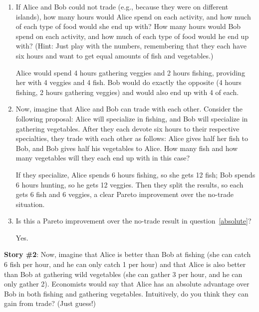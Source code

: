 \documentclass{article}
\newcommand{\myskip}{\vspace{.1in}}
\begin{document}
    \begin{enumerate}
    \item \label{absolute} If Alice and Bob could not trade (e.g., because they were on different islands), how many hours would Alice spend on each activity, and how much of each type of food would she end up with? How many hours would Bob spend on each activity, and how much of each type of food would he end up with? (Hint: Just play with the numbers, remembering that they each have six hours and want to get equal amounts of fish and vegetables.)
\myskip

\begin{KEY}
Alice would spend 4 hours gathering veggies and 2 hours fishing, providing her with 4 veggies and 4 fish. Bob would do exactly the opposite (4 hours fishing, 2 hours gathering veggies) and would also end up with 4 of each.
\end{KEY}

    \item Now, imagine that Alice and Bob can trade with each other. Consider the following proposal: Alice will specialize in fishing, and Bob will specialize in gathering vegetables. After they each devote six hours to their respective specialties, they trade with each other as follows: Alice gives half her fish to Bob, and Bob gives half his vegetables to Alice. How many fish and how many vegetables will they each end up with in this case?
\myskip

\begin{KEY}
If they specialize, Alice spends 6 hours fishing, so she gets 12 fish; Bob spends 6 hours hunting, so he gets 12 veggies. Then they split the results, so each gets 6 fish and 6 veggies, a clear Pareto improvement over the no-trade situation.
\end{KEY}


    \item Is this a Pareto improvement over the no-trade result in question~\ref{absolute}? %
\myskip

\begin{KEY}
Yes.
\end{KEY}

    \end{enumerate}


\noindent \textbf{Story \#2}: Now, imagine that Alice is better than Bob at fishing (she can catch 6 fish per hour, and he can only catch 1 per hour) and that Alice is also better than Bob at gathering wild vegetables (she can gather 3 per hour, and he can only gather 2). Economists would say that Alice has an absolute advantage over Bob in both fishing and gathering vegetables. Intuitively, do you think they can gain from trade?  %
(Just guess!) 
\end{document}
